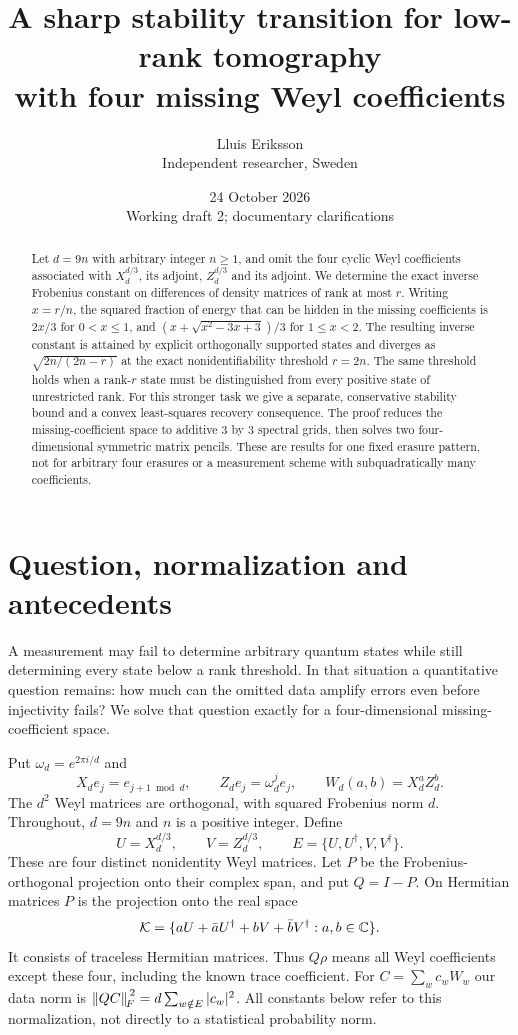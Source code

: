 \documentclass[11pt,a4paper]{article}
\title{A sharp stability transition for low-rank tomography\\with four missing Weyl coefficients}
\author{Lluis Eriksson\\\small Independent researcher, Sweden}
\date{24 October 2026\\Working draft 2; documentary clarifications}
\theoremstyle{remark}\newtheorem{remark}[theorem]{Remark}
\begin{document}
\maketitle
\begin{abstract}
Let $d=9n$ with arbitrary integer $n\ge1$, and omit the four cyclic Weyl
coefficients associated with $X_d^{d/3}$, its adjoint, $Z_d^{d/3}$ and its
adjoint. We determine the exact inverse Frobenius constant on differences
of density matrices of rank at most $r$. Writing $x=r/n$, the squared
fraction of energy that can be hidden in the missing coefficients is
$2x/3$ for $0<x\le1$, and
$(x+\sqrt{x^2-3x+3})/3$ for $1\le x<2$.
The resulting inverse constant is attained by explicit orthogonally
supported states and diverges as $\sqrt{2n/(2n-r)}$ at the exact
nonidentifiability threshold $r=2n$. The same threshold holds when a
rank-$r$ state must be distinguished from every positive state of
unrestricted rank. For this stronger task we give a separate, conservative
stability bound and a convex least-squares recovery consequence. The
proof reduces the missing-coefficient space to additive $3$ by $3$
spectral grids, then solves two four-dimensional symmetric matrix
pencils. These are results for one fixed erasure pattern, not for
arbitrary four erasures or a measurement scheme with subquadratically
many coefficients.
\end{abstract}

\section{Question, normalization and antecedents}
A measurement may fail to determine arbitrary quantum states while still
determining every state below a rank threshold. In that situation a
quantitative question remains: how much can the omitted data amplify
errors even before injectivity fails? We solve that question exactly for
a four-dimensional missing-coefficient space.

Put $\omega_d=e^{2\pi i/d}$ and
\[
 X_de_j=e_{j+1\bmod d},\qquad Z_de_j=\omega_d^je_j,\qquad
 W_d(a,b)=X_d^aZ_d^b .
\]
The $d^2$ Weyl matrices are orthogonal, with squared Frobenius norm $d$.
Throughout, $d=9n$ and $n$ is a positive integer. Define
\[
 U=X_d^{d/3},\qquad V=Z_d^{d/3},\qquad
 E=\{U,U^\dagger,V,V^\dagger\}.
\]
These are four distinct nonidentity Weyl matrices. Let $P$ be the
Frobenius-orthogonal projection onto their complex span, and put $Q=I-P$.
On Hermitian matrices $P$ is the projection onto the real space
\begin{equation}\label{eq:kernel}
 \mathcal K=\{aU+\bar a U^\dagger+bV+\bar b V^\dagger:a,b\in\mathbb C\}.
\end{equation}
It consists of traceless Hermitian matrices. Thus $Q\rho$ means all Weyl
coefficients except these four, including the known trace coefficient.
For $C=\sum_w c_wW_w$ our data norm is
$\left\|QC\right\|_{\!F}^{\,2}=d\sum_{w\notin E}|c_w|^2$.
All constants below refer to this normalization, not directly to a
statistical probability norm.
\end{document}
